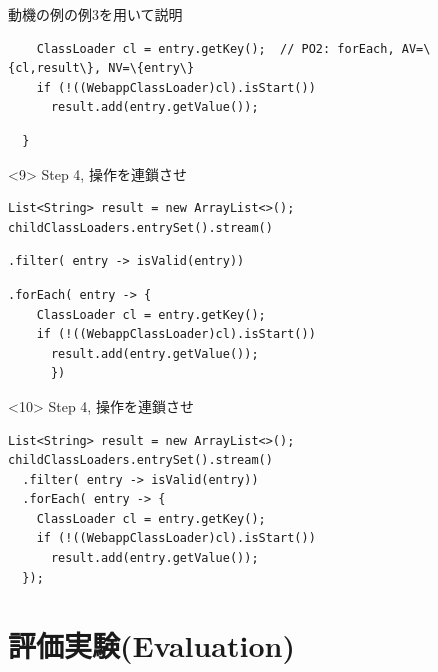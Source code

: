 \begin{frame}[fragile]{動機の例の例3を用いて説明}
\begin{onlyenv}
\begin{lstlisting}
    ClassLoader cl = entry.getKey();  // PO2: forEach, AV=\{cl,result\}, NV=\{entry\}
    if (!((WebappClassLoader)cl).isStart())
      result.add(entry.getValue());
\end{lstlisting}
\begin{lstlisting}
  }
\end{lstlisting}
\end{onlyenv}
\begin{onlyenv}<9>
Step 4, 操作を連鎖させ
\begin{lstlisting}
List<String> result = new ArrayList<>();
childClassLoaders.entrySet().stream()
\end{lstlisting}
\begin{lstlisting}[morekeywords={map,filter,reduce,forEach,anyMatch,noneMatch}]
  .filter( entry -> isValid(entry))
\end{lstlisting}
\begin{lstlisting}[morekeywords={map,filter,reduce,forEach,anyMatch,noneMatch}]
  .forEach( entry -> {
    ClassLoader cl = entry.getKey();
    if (!((WebappClassLoader)cl).isStart())
      result.add(entry.getValue());
      })
\end{lstlisting}
\end{onlyenv}
\begin{onlyenv}<10>
Step 4, 操作を連鎖させ
\begin{lstlisting}[morekeywords={map,filter,reduce,forEach,anyMatch,noneMatch}]
List<String> result = new ArrayList<>();
childClassLoaders.entrySet().stream()
  .filter( entry -> isValid(entry))
  .forEach( entry -> {
    ClassLoader cl = entry.getKey();
    if (!((WebappClassLoader)cl).isStart())
      result.add(entry.getValue());
  });
\end{lstlisting}
\end{onlyenv}
\end{frame}
\section{評価実験(Evaluation)}
